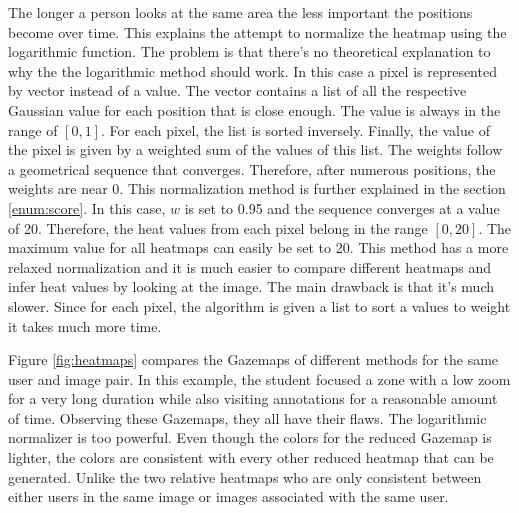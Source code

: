 \documentclass[a4paper,11pt]{report}
\numberwithin{figure}{section} %
\begin{document}
\begin{itemize}
\begin{itemize}
            The longer a person looks at the same area the less important the positions become over time.
            This explains the attempt to normalize the heatmap using the logarithmic function.
            The problem is that there's no theoretical explanation to why the the logarithmic method should work.
            In this case a pixel is represented by vector instead of a value.
            The vector contains a list of all the respective Gaussian value for each position that is close enough.
            The value is always in the range of $[0,1]$.
            For each pixel, the list is sorted inversely.
            Finally, the value of the pixel is given by a weighted sum of the values of this list.
            The weights follow a geometrical sequence that converges.
            Therefore, after numerous positions, the weights are near 0.
            This normalization method is further explained in the section \ref{enum:score}.
            In this case, $w$ is set to 0.95 and the sequence converges at a value of 20.
            Therefore, the heat values from each pixel belong in the range $[0,20]$.
            The maximum value for all heatmaps can easily be set to 20.
            This method has a more relaxed normalization and it is much easier to compare different heatmaps and infer heat values by looking at the image.
            The main drawback is that it's much slower.
            Since for each pixel, the algorithm is given a list to sort a values to weight it takes much more time.
        \end{itemize}
        Figure \ref{fig:heatmaps} compares the Gazemaps of different methods for the same user and image pair.
        In this example, the student focused a zone with a low zoom for a very long duration while also visiting annotations for a reasonable amount of time.
        Observing these Gazemaps, they all have their flaws.
        The logarithmic normalizer is too powerful.
        Even though the colors for the reduced Gazemap is lighter, the colors are consistent with every other reduced heatmap that can be generated.
        Unlike the two relative heatmaps who are only consistent between either users in the same image or images associated with the same user.


\end{itemize}
\end{document}
